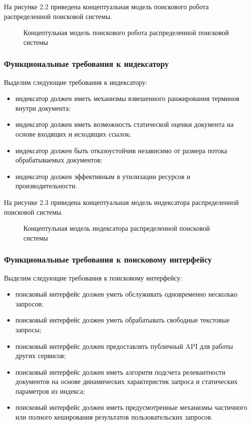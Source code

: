 На рисунке 2.2 приведена концептуальная модель поискового робота распределенной поисковой системы.

\begin{figure}[H]
\caption{Концептульная модель поискового робота распределенной поисковой системы}
\label{concept_robot_model:image}
\end{figure}

\subsubsection{Функциональные требования к индексатору}
Выделим следующие требования к индексатору:
\begin{itemize}
\item индексатор должен иметь механизмы взвешенного ранжирования терминов внутри документа;
\item индексатор должен иметь возможность статической оценки документа на основе входящих и исходящих ссылок;
\item индексатор должен быть отказоустойчив независимо от размера потока обрабатываемых документов;
\item индексатор должен эффективным в утилизации ресурсов и производительности.
\end{itemize}

На рисунке 2.3 приведена концептуальная модель индексатора распределенной поисковой системы.

\begin{figure}[H]
\caption{Концептульная модель индексатора распределенной поисковой системы}
\label{concept_indexer_model:image}
\end{figure}

\subsubsection{Функциональные требования к поисковому интерфейсу}
Выделим следующие требования к поисковому интерфейсу:
\begin{itemize}
\item поисковый интерфейс должен уметь обслуживать одновременно несколько запросов;
\item поисковый интерфейс должен уметь обрабатывать свободные текстовые запросы;
\item поисковый интерфейс должен предоставлять публичный API для работы других сервисов;
\item поисковый интерфейс должен иметь алгоритм подсчета релевантности документов на основе динамических характеристик запроса и статических параметров из индекса;
\item поисковый интерфейс должен иметь предусмотренные механизмы частичного или полного кеширования результатов пользовательских запросов.
\end{itemize}

